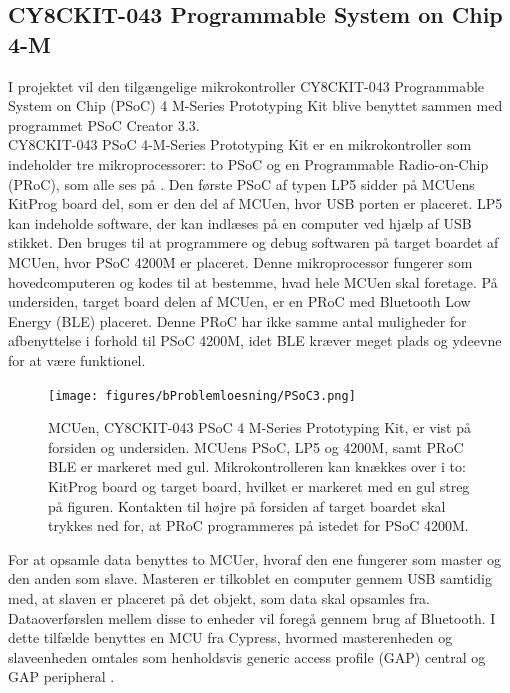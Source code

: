 \subsection{CY8CKIT-043 Programmable System on Chip 4-M}
I projektet vil den tilgængelige mikrokontroller CY8CKIT-043 Programmable System on Chip (PSoC) 4 M-Series Prototyping Kit blive benyttet sammen med programmet PSoC Creator 3.3.\\
CY8CKIT-043 PSoC 4-M-Series Prototyping Kit er en mikrokontroller som indeholder tre mikroprocessorer: to PSoC og en Programmable Radio-on-Chip (PRoC), som alle ses på . Den første PSoC af typen LP5 sidder på MCUens KitProg board del, som er den del af MCUen, hvor USB porten er placeret. LP5 kan indeholde software, der kan indlæses på en computer ved hjælp af USB stikket. Den bruges til at programmere og debug softwaren på target boardet af MCUen, hvor PSoC 4200M er placeret. %
Denne mikroprocessor fungerer som hovedcomputeren og kodes til at bestemme, hvad hele MCUen skal foretage. %
På undersiden, target board delen af MCUen, er en PRoC med Bluetooth Low Energy (BLE) placeret. Denne PRoC har ikke samme antal muligheder for afbenyttelse i forhold til PSoC 4200M, idet BLE kræver meget plads og ydeevne for at være funktionel. \citep{CYPRESS2016PSoC,Semiconductor2016,CYPRESS2016Cortexm0}
\begin{figure}[H]
	\centering
	\texttt{[image: figures/bProblemloesning/PSoC3.png]}
	\caption{MCUen, CY8CKIT-043 PSoC 4 M-Series Prototyping Kit, er vist på forsiden og undersiden. MCUens PSoC, LP5 og 4200M, samt PRoC BLE er markeret med gul. Mikrokontrolleren kan knækkes over i to: KitProg board og target board, hvilket er markeret med en gul streg på figuren. Kontakten til højre på forsiden af target boardet skal trykkes ned for, at PRoC programmeres på istedet for PSoC 4200M. \citep{CYPRESS2016PSoC,Semiconductor2016}}
	\label{fig:PSoC}
\end{figure}\vspace{-0.2cm}
For at opsamle data benyttes to MCUer, hvoraf den ene fungerer som master og den anden som slave. Masteren er tilkoblet en computer gennem USB samtidig med, at slaven er placeret på det objekt, som data skal opsamles fra. Dataoverførslen mellem disse to enheder vil foregå gennem brug af Bluetooth. I dette tilfælde benyttes en MCU fra Cypress, hvormed masterenheden og slaveenheden omtales som henholdsvis generic access profile (GAP) central og GAP peripheral \citep{Luthra2015}.

